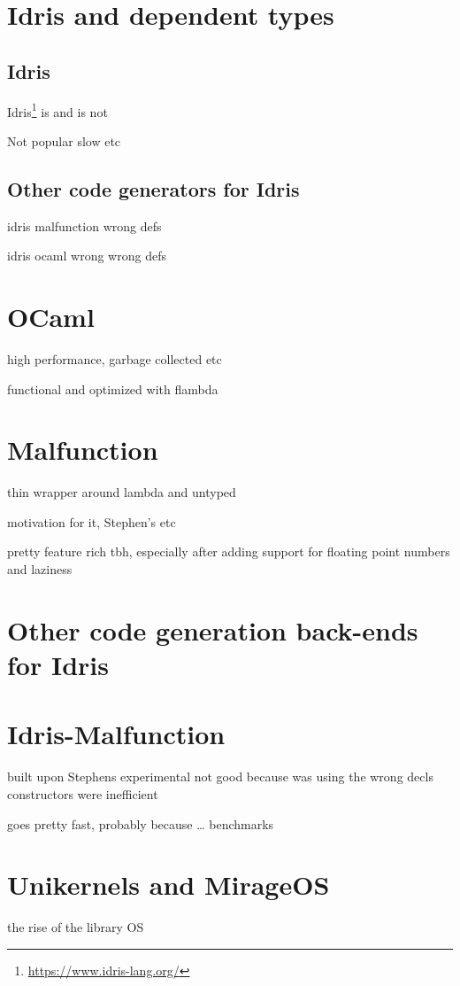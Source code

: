 \section{Idris and dependent types}
\subsection{Idris}
Idris\footnote{\url{https://www.idris-lang.org/}} is and is not

Not popular slow etc 


\subsection{Other code generators for Idris}
idris malfunction  wrong defs

idris ocaml wrong  wrong defs 

\section{OCaml}
high performance, garbage collected etc

functional and optimized with flambda

\section{Malfunction}
thin wrapper around lambda and untyped

motivation for it, Stephen's etc

pretty feature rich tbh, especially after adding support
for floating point numbers and laziness

\section{Other code generation back-ends for Idris}

\section{Idris-Malfunction}
built upon Stephens experimental 
not good because was using the wrong decls
constructors were inefficient

goes pretty fast, probably because \ldots
benchmarks

\section{Unikernels and MirageOS}
the rise of the library OS